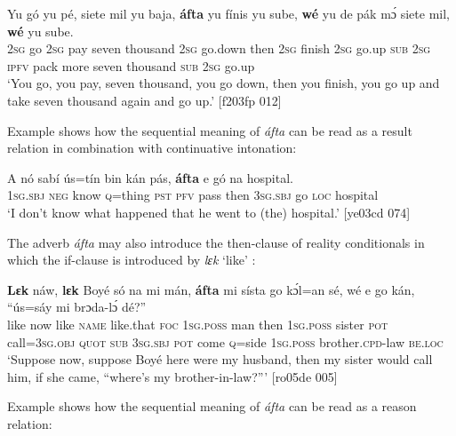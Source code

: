 \ea%
    \label{ex:key:1355}
    \gll Yu  gó  yu  pé,  siete  mil      yu  baja,  \textbf{áfta}    yu  fínis    yu  sube,
\textbf{wé}  yu  de  pák    mɔ́    siete  mil,      \textbf{wé}  yu  sube.\\
\textsc{2sg}  go  \textsc{2sg}  pay  seven  thousand  \textsc{2sg}  go.down  then  \textsc{2sg}  finish  \textsc{2sg}  go.up
\textsc{sub}  \textsc{2sg}  \textsc{ipfv}  pack  more  seven  thousand  \textsc{sub}  \textsc{2sg}  go.up\\

\glt ‘You go, you pay, seven thousand, you go down, then you finish, you 
go up and take seven thousand again and go up.’ [f203fp 012]
\z

Example  shows how the sequential meaning of \textit{áfta} can be read as a result relation in combination with continuative intonation:


\ea%
    \label{ex:key:1356}
    \gll \MakeUppercase{A}   nó  sabí    ús=tín  bin  kán  pás,    \textbf{áfta}    e    gó  
na  hospital.\\
\textsc{1sg.sbj}  \textsc{neg}  know  \textsc{q}=thing  \textsc{pst}  \textsc{pfv}  pass    then  \textsc{3sg.sbj}  go 
\textsc{loc}  hospital\\
\glt ‘I don’t know what happened that he went to (the) hospital.’ [ye03cd 074]
\z

The adverb \textit{áfta} may also introduce the then-clause of reality conditionals in which the if-clause is introduced by \textit{lɛk} ‘like’ :{\fff}


\ea%
    \label{ex:key:1357}
    \gll \textbf{Lɛk}  náw,  \textbf{lɛk}  Boyé  só    na  mi    mán,  \textbf{áfta}    mi    sísta  
go  kɔ́l=an    sé,    wé  e    go  kán,    “ús=sáy  mi
brɔda-lɔ́      dé?”\\
like  now    like  \textsc{name}  like.that  \textsc{foc}  \textsc{1sg.poss}  man    then  \textsc{1sg.poss}  sister
\textsc{pot}  call=\textsc{3sg.obj}  \textsc{quot}    \textsc{sub}  \textsc{3sg.sbj}  \textsc{pot}  come   \textsc{q}=side  \textsc{1sg.poss}
brother.\textsc{cpd}{}-law  \textsc{be.loc}\\

\glt ‘Suppose now, suppose Boyé here were my husband, then my sister would 
call him, if she came, “where’s my brother-in-law?”’ [ro05de 005]
\z

Example  shows how the sequential meaning of \textit{áfta} can be read as a reason relation: 


